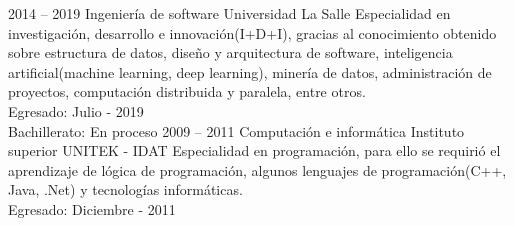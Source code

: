 
\begin{entrylist}
	\entry
		{2014 -- 2019}
		{Ingeniería de software}
		{Universidad La Salle}
		{
		    Especialidad en investigación, desarrollo e innovación(I+D+I), gracias al conocimiento obtenido sobre estructura de datos, diseño y arquitectura de software, inteligencia artificial(machine learning, deep learning), minería de datos, administración de proyectos, computación distribuida y paralela, entre otros.\\
		    
		    Egresado: Julio - 2019 \\
		    Bachillerato: En proceso
		}
	\entry
		{2009 -- 2011}
		{Computación e informática}
		{Instituto superior UNITEK - IDAT}
		{
		    Especialidad en programación, para ello se requirió el aprendizaje de lógica de programación, algunos lenguajes de programación(C++, Java, .Net) y tecnologías informáticas.\\
		    
		    Egresado: Diciembre - 2011
        }
\end{entrylist}

